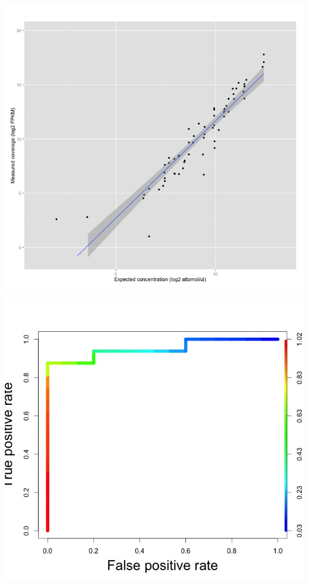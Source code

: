 \documentclass[]{article}
\begin{document}
\includegraphics{5.jpeg}

\includegraphics{3.jpeg}
\end{document}
